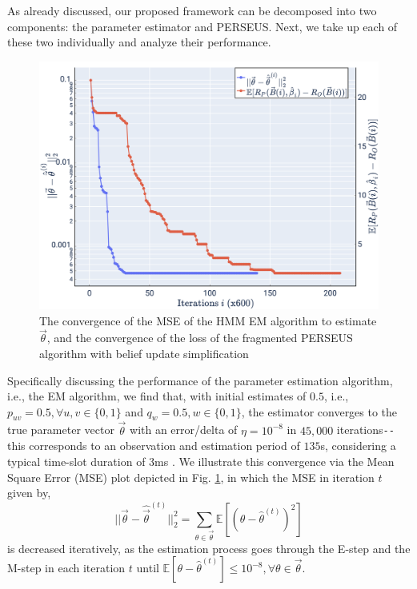 As already discussed, our proposed framework can be decomposed into two components: the parameter estimator and PERSEUS. Next, we take up each of these two individually and analyze their performance.
\begin{figure} [htb]
    \centerline{
    \includegraphics[width = 1.0\textwidth]{PerseusRegretConvergence_NormSquareErrorConvergence.png}}
    \caption{The convergence of the MSE of the HMM EM algorithm to estimate $\vec{\theta}$, and the convergence of the loss of the fragmented PERSEUS algorithm with belief update simplification}
    \label{Fig. 7}
\end{figure}

Specifically discussing the performance of the parameter estimation algorithm, i.e., the EM algorithm, we find that, with initial estimates of $0.5$, i.e., $p_{uv}{=}0.5,{\forall}u,v{\in}\{0,1\}$ and $q_{w}{=}0.5,w{\in}\{0,1\}$, the estimator converges to the true parameter vector $\vec{\theta}$ with an error/delta of $\eta{=}10^{-8}$ in $45,000$ iterations\texttt{-{}-}this corresponds to an observation and estimation period of $135$s, considering a typical time-slot duration of $3$ms \cite{WCL:paper}. We illustrate this convergence via the Mean Square Error (MSE) plot depicted in Fig. \ref{Fig. 7}, in which the MSE in iteration $t$ given by,
\begin{equation}\label{32}
    ||\vec{\theta}-\hat{\vec{\theta}}^{(t)}||_{2}^{2}=\sum_{\theta \in \vec{\theta}}\mathbb{E}[(\theta-\hat{\theta}^{(t)})^{2}]
\end{equation}
is decreased iteratively, as the estimation process goes through the E-step and the M-step in each iteration $t$ until $\mathbb{E}[\theta{-}\hat{\theta}^{(t)}]{\leq}10^{-8},{\forall}\theta{\in}\vec{\theta}$.

